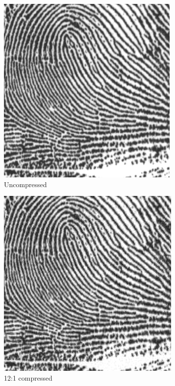 \begin{figure}
\centering
\begin{subfigure}{.32\textwidth}
  \centering
  \includegraphics[width=.7\linewidth]{uncompressed_finger.png}
  \caption{Uncompressed}
  \label{fig:sub1}
\end{subfigure}%
\begin{subfigure}{.32\textwidth}
  \centering
  \includegraphics[width=.7\linewidth]{compressed_finger(30comp).png}
  \caption{12:1 compressed}
  \label{fig:sub1}
\end{subfigure}%
\begin{subfigure}{.32\textwidth}
  \centering

\end{subfigure}
\end{figure}
